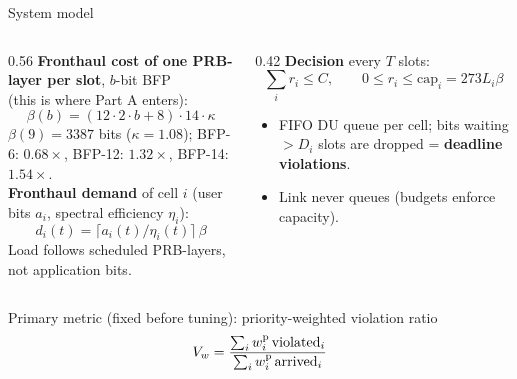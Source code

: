 \documentclass[aspectratio=169,11pt,xcolor=table]{beamer}
\begin{document}
\begin{frame}{System model}
  \small
  \begin{columns}[T]
    \begin{column}{0.56\textwidth}
      \textbf{Fronthaul cost of one PRB-layer per slot}, $b$-bit BFP\\(this is where Part A enters):
      \[
        \beta(b) = (12\cdot 2\cdot b + 8)\cdot 14\cdot\kappa
      \]
      $\beta(9) = 3387$ bits ($\kappa = 1.08$); BFP-6: $0.68\times$, BFP-12: $1.32\times$, BFP-14: $1.54\times$.\\[4pt]
      \textbf{Fronthaul demand} of cell $i$ (user bits $a_i$, spectral efficiency $\eta_i$):
      \[
        d_i(t) = \lceil a_i(t)/\eta_i(t)\rceil\,\beta
      \]
      Load follows scheduled PRB-layers, not application bits.
    \end{column}
    \begin{column}{0.42\textwidth}
      \textbf{Decision} every $T$ slots:
      \[
        \sum_i r_i \le C, \qquad 0 \le r_i \le \mathrm{cap}_i = 273 L_i\beta
      \]
      \begin{itemize}
        \item FIFO DU queue per cell; bits waiting $> D_i$ slots are dropped = \textbf{deadline violations}.
        \item Link never queues (budgets enforce capacity).
      \end{itemize}
    \end{column}
  \end{columns}
  \begin{block}{Primary metric (fixed before tuning): priority-weighted violation ratio}
    \[
      V_w = \frac{\sum_i w_i^{\rm p}\,\mathrm{violated}_i}{\sum_i w_i^{\rm p}\,\mathrm{arrived}_i}
    \]
  \end{block}
\end{frame}
\end{document}

